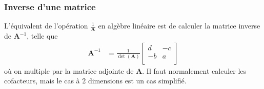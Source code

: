 \documentclass[10pt, french]{article}
\begin{document}
\begin{multicols*}{3}
\subsubsection*{Inverse d'une matrice} L'équivalent de l'opération $\frac{1}{\bm{A}}$ en algèbre linéaire est de calculer la matrice inverse de $\bm{A}^{-1}$, telle que		
\begin{align*}
\bm{A}^{-1}	& = \frac{1}{\det(\bm{A})}
\begin{bmatrix}
d	& -c \\
-b	& a \\
\end{bmatrix}
\end{align*}
où on multiple par la matrice adjointe de $\bm{A}$. Il faut normalement calculer les cofacteurs, mais le cas à 2 dimensions est un cas simplifié.



\end{multicols*}


\end{document}
